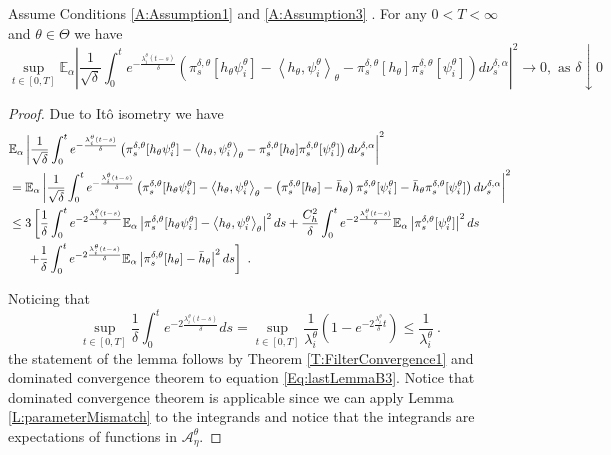 \documentclass{article}
\begin{document}
\begin{lemma}\label{L:ConvergenceInProb1}
Assume Conditions \ref{A:Assumption1} and \ref{A:Assumption3} . For any $0<T<\infty$ and $\theta\in \Theta$ we have
\[
\sup_{t\in[0,T]}\mathbb{E}_{\alpha}\left|\frac{1}{\sqrt{\delta}}\int_0^t e^{-\frac{\lambda_i^{\theta}(t-s)}{\delta}}
\left(\pi_s^{\delta,\theta}[h_{\theta}\psi_i^{\theta}]-\left<h_{\theta},\psi_i^{\theta}\right>_{\theta}-\pi_s^{\delta,\theta}[h_{\theta}]\pi_s^{\delta,\theta}[\psi_i^{\theta}]\right)
d\nu_s^{\delta,\alpha}\right|^{2}\rightarrow 0, \textrm{ as }\delta\downarrow 0
\]
\end{lemma}
\begin{proof}
Due to It\^{o} isometry we have
\begin{align}
&\mathbb{E}_{\alpha}\left|\frac{1}{\sqrt{\delta}}\int_0^t e^{-\frac{\lambda_i^{\theta}(t-s)}{\delta}}
\left(\pi_s^{\delta,\theta}[h_{\theta}\psi_i^{\theta}]-\left<h_{\theta},\psi_i^{\theta}\right>_{\theta}-\pi_s^{\delta,\theta}[h_{\theta}]\pi_s^{\delta,\theta}[\psi_i^{\theta}]\right)
d\nu_s^{\delta,\alpha}\right|^{2} \nonumber\\
&=\mathbb{E}_{\alpha}\left|\frac{1}{\sqrt{\delta}}\int_0^t e^{-\frac{\lambda_i^{\theta}(t-s)}{\delta}}
\left(\pi_s^{\delta,\theta}[h_{\theta}\psi_i^{\theta}]-\left<h_{\theta},\psi_i^{\theta}\right>_{\theta}-\left(\pi_s^{\delta,\theta}[h_{\theta}]-\bar h_\theta\right)\pi_s^{\delta,\theta}[\psi_i^{\theta}]-\bar h_\theta\pi_s^{\delta,\theta}[\psi_i^{\theta}]\right)
d\nu_s^{\delta,\alpha}\right|^{2} \nonumber\\
&\leq 3 \left[\frac{1}{\delta} \int_0^t e^{-2\frac{\lambda_i^{\theta}(t-s)}{\delta}}
\mathbb{E}_{\alpha}\left|\pi_s^{\delta,\theta}[h_{\theta}\psi_i^{\theta}]-\left<h_{\theta},\psi_i^{\theta}\right>_{\theta}\right|^{2} ds+\frac{C_h^2}{\delta} \int_0^t e^{-2\frac{\lambda_i^{\theta}(t-s)}{\delta}}
\mathbb{E}_{\alpha}\left|\pi_s^{\delta,\theta}[\psi_i^{\theta}]\right|^{2} ds\right.\nonumber\\
&\hspace{0.5cm} \left.
+\frac{1}{\delta} \int_0^t e^{-2\frac{\lambda_i^{\theta}(t-s)}{\delta}}
\mathbb{E}_{\alpha}\left|\pi_s^{\delta,\theta}[h_{\theta}]-\bar{h}_{\theta}\right|^{2} ds\right]\ .
\label{Eq:lastLemmaB3}
\end{align}

Noticing that
\[
\sup_{t\in[0,T]}\frac{1}{\delta} \int_0^t e^{-2\frac{\lambda_i^{\theta}(t-s)}{\delta}}ds=\sup_{t\in[0,T]}\frac{1}{\lambda_{i}^\theta}\left(1-e^{-2\frac{\lambda_i^{\theta}}{\delta} t}\right)\leq \frac{1}{\lambda_{i}^\theta}\ .
\]
the statement of the lemma follows by Theorem \ref{T:FilterConvergence1} and dominated convergence theorem to equation \eqref{Eq:lastLemmaB3}. Notice that  dominated convergence theorem is applicable since we can apply Lemma \ref{L:parameterMismatch} to the integrands and notice that the integrands are expectations of functions in $\mathcal A_\eta^\theta$.
\end{proof}
\end{document}
